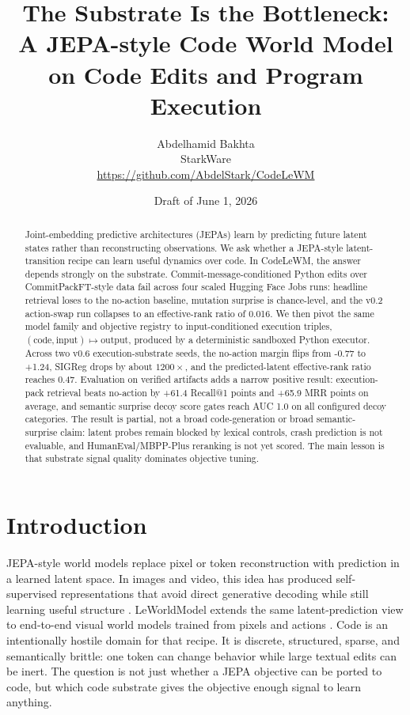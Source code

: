 \documentclass[11pt]{article}
\title{The Substrate Is the Bottleneck:\\
  A JEPA-style Code World Model on Code Edits and Program Execution}
\author{
  Abdelhamid Bakhta\\
  StarkWare\\
  \url{https://github.com/AbdelStark/CodeLeWM}
}
\date{Draft of June 1, 2026}
\newcommand{\modelname}{CodeLeWM}
\begin{document}
\maketitle

\begin{abstract}
Joint-embedding predictive architectures (JEPAs) learn by predicting future
latent states rather than reconstructing observations. We ask whether a
JEPA-style latent-transition recipe can learn useful dynamics over code. In
\modelname{}, the answer depends strongly on the substrate.
Commit-message-conditioned Python edits over CommitPackFT-style data fail
across four scaled
Hugging Face Jobs runs: headline retrieval loses to the no-action baseline,
mutation surprise is chance-level, and the v0.2 action-swap run collapses to an
effective-rank ratio of 0.016. We then pivot the same model family and objective
registry to input-conditioned execution triples,
\((\mathrm{code}, \mathrm{input}) \mapsto \mathrm{output}\), produced by a
deterministic sandboxed Python executor. Across two v0.6 execution-substrate
seeds, the no-action margin flips from -0.77 to +1.24, SIGReg drops by about
\(1200\times\), and the predicted-latent effective-rank ratio reaches 0.47.
Evaluation on verified artifacts adds a narrow positive result: execution-pack
retrieval beats no-action by +61.4 Recall@1 points and +65.9 MRR points on
average, and semantic surprise decoy score gates reach AUC 1.0 on all
configured decoy categories. The result is partial, not a broad code-generation
or broad semantic-surprise claim: latent probes remain blocked by lexical
controls, crash prediction is not evaluable, and HumanEval/MBPP-Plus reranking
is not yet scored. The main lesson is that
substrate signal quality dominates objective tuning.
\end{abstract}

\section{Introduction}

JEPA-style world models replace pixel or token reconstruction with prediction
in a learned latent space. In images and video, this idea has produced
self-supervised representations that avoid direct generative decoding while
still learning useful structure \citep{assran2023selfsupervisedlearningimagesjointembedding,bardes2024revisitingfeaturepredictionlearning}.
LeWorldModel extends the same latent-prediction view to end-to-end visual
world models trained from pixels and actions \citep{maes2026leworldmodelstableendtoendjointembedding}.
Code is an intentionally hostile domain for that recipe. It is discrete,
structured, sparse, and semantically brittle: one token can change behavior
while large textual edits can be inert. The question is not just whether a JEPA
objective can be ported to code, but which code substrate gives the objective
enough signal to learn anything.
\end{document}
